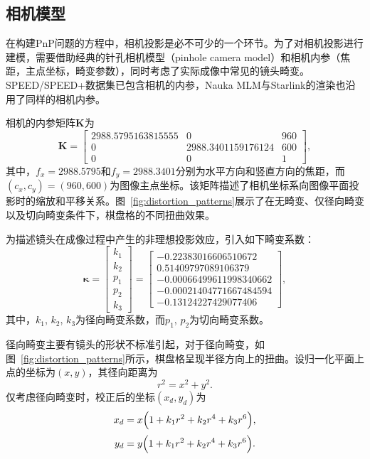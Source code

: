 \subsection{相机模型}
在构建PnP问题的方程中，相机投影是必不可少的一个环节。为了对相机投影进行建模，需要借助经典的针孔相机模型（pinhole camera model）和相机内参（焦距，主点坐标，畸变参数），同时考虑了实际成像中常见的镜头畸变。SPEED/SPEED+数据集已包含相机的内参，Nauka MLM与Starlink的渲染也沿用了同样的相机内参。



相机的内参矩阵$\mathbf{K}$为
\begin{equation}
	\mathbf{K} =  
	\begin{bmatrix}
		2988.5795163815555 & 0 & 960 \\
		0 & 2988.3401159176124 & 600 \\
		0 & 0 & 1
	\end{bmatrix},
	\label{eq:cameraMatrix}
\end{equation}
其中，$f_x=2988.5795$和$f_y=2988.3401$分别为水平方向和竖直方向的焦距，而$(c_x, c_y)=(960,600)$为图像主点坐标。该矩阵描述了相机坐标系向图像平面投影时的缩放和平移关系。图~\ref{fig:distortion_patterns}展示了在无畸变、仅径向畸变以及切向畸变条件下，棋盘格的不同扭曲效果。


为描述镜头在成像过程中产生的非理想投影效应，引入如下畸变系数：
\begin{equation}
	\boldsymbol{\kappa} = 
	\begin{bmatrix}
		k_1 \\[2pt] k_2 \\[2pt] p_1 \\[2pt] p_2 \\[2pt] k_3
	\end{bmatrix}
	=
	\begin{bmatrix}
		-0.22383016606510672\\[2pt]
		0.51409797089106379\\[2pt]
		-0.00066499611998340662\\[2pt]
		-0.00021404771667484594\\[2pt]
		-0.13124227429077406
	\end{bmatrix},
\end{equation}
其中，$k_1$, $k_2$, $k_3$为径向畸变系数，而$p_1$, $p_2$为切向畸变系数。


径向畸变主要有镜头的形状不标准引起，对于径向畸变，如图~\ref{fig:distortion_patterns}所示，棋盘格呈现半径方向上的扭曲。设归一化平面上点的坐标为$(x,y)$，其径向距离为
\begin{equation}
	r^2 = x^2 + y^2.
\end{equation}
仅考虑径向畸变时，校正后的坐标$(x_d,y_d)$为
\begin{equation}
	\begin{aligned}
		x_{d} &= x\Bigl(1 + k_1r^2 + k_2r^4 + k_3r^6\Bigr),\\[2pt]
		y_{d} &= y\Bigl(1 + k_1r^2 + k_2r^4 + k_3r^6\Bigr).
	\end{aligned}
\end{equation}


